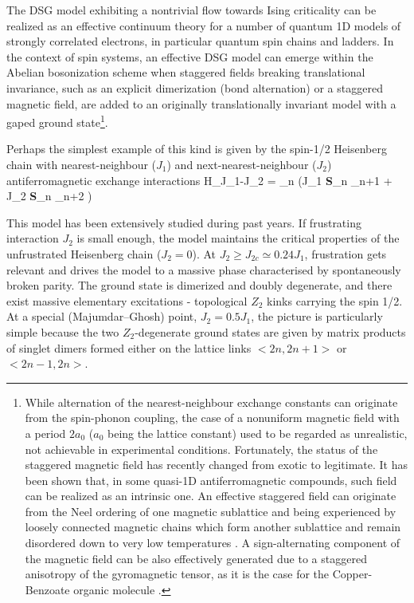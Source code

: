 The DSG model exhibiting a nontrivial flow towards Ising criticality
can be realized as an effective continuum theory for 
a number of quantum 1D models of strongly correlated
electrons, in particular quantum spin chains and ladders.
In the context of spin systems, an effective DSG model
can emerge within the Abelian bosonization scheme
when staggered fields
breaking translational invariance, such as an explicit dimerization
(bond alternation)\cite{aff-conf} or a staggered magnetic field,
are added to an originally translationally invariant model with a gaped
ground state\footnote{While alternation of the nearest-neighbour
exchange constants can originate from the
spin-phonon coupling, 
the case of a nonuniform magnetic field with 
a period $2a_0$ ($a_0$ being the lattice constant)
used to be regarded as unrealistic, not achievable in experimental conditions.
Fortunately, the status of the staggered magnetic field has recently changed
from exotic to legitimate.
It has been shown that, in some quasi-1D antiferromagnetic compounds,
such field can be realized as an intrinsic one. An effective 
staggered field can
originate from the Neel ordering of one magnetic sublattice and being
experienced by loosely connected magnetic chains which form another sublattice
and remain disordered down to very low temperatures \cite{MZ}.
A sign-alternating component of the magnetic field can be also 
effectively generated
due to a staggered anisotropy of the gyromagnetic tensor,
as it is the case for the Copper-Benzoate organic molecule \cite{benzoate}.}. 



Perhaps the simplest example of this kind is given by
the spin-1/2 Heisenberg chain with nearest-neighbour ($J_1$) and
next-nearest-neighbour ($J_2$) antiferromagnetic exchange interactions
\be
H_{J_1-J_2} = \sum_n \left(J_1 {\bf S}_n _{n+1}
+ J_2 {\bf S}_n _{n+2}  \right)
\label{J1J2lattice}
\ee

This model
has been extensively studied during past years. If frustrating interaction
$J_2$ is small enough, the model maintains the critical properties of the 
unfrustrated Heisenberg chain ($J_2 = 0$). 
At $J_2 \geq J_{2c}\simeq 0.24 J_1$, frustration
gets relevant and drives the model to a massive phase characterised by
spontaneously broken parity\cite{j1j2,WA}. The ground state is dimerized and 
doubly
degenerate, and there exist massive elementary excitations - topological
$Z_2$ kinks carrying the spin 1/2. At a special (Majumdar--Ghosh)
point, $J_2 = 0.5 J_1$, the picture is particularly simple because 
the two $Z_2$-degenerate ground states are given by
matrix products of singlet dimers formed either on the lattice
links $<2n,2n+1>$ or $<2n-1,2n>$.


